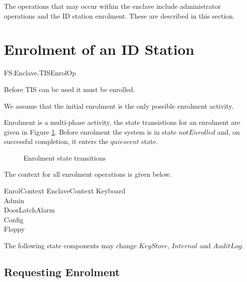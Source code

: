 The operations that may occur within the enclave include
administrator operations and the ID station enrolment. These are
described in this section.

\section{Enrolment of an ID Station}

\begin{traceunit}{FS.Enclave.TISEnrolOp}
\end{traceunit}

Before TIS can be used it must be enrolled.

We assume
that the initial enrolment is the only possible enrolment activity.

Enrolment is a multi-phase activity, the state transistions for an
enrolment are given in Figure \ref{fig:enrol}. Before enrolment the
system is in state $notEnrolled$ and, on successful completion, it
enters the $quiescent$ state.

\begin{figure}[htbp]
  \begin{center}
    \leavevmode
    \caption{Enrolment state transitions}
    \label{fig:enrol}
  \end{center}
\end{figure}

The context for all enrolment operations is given below.

\begin{schema}{EnrolContext}
        EnclaveContext
\also
        \Xi Keyboard
\\      \Xi Admin
\\      \Xi DoorLatchAlarm
\\      \Xi Config
\\      \Xi Floppy
\end{schema}

\begin{Zcomment}
\item
The following state components may change
$KeyStore$, $Internal$ and $AuditLog$. 
\end{Zcomment}


\subsection{Requesting Enrolment}

